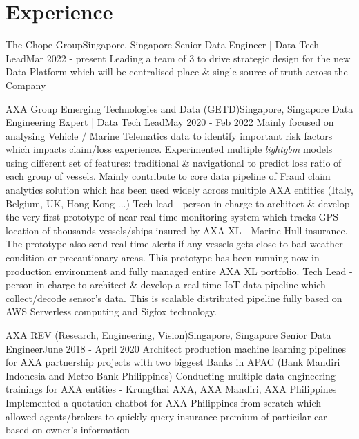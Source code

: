 \section{Experience}
  \resumeSubHeadingListStart

    \resumeSubheading
      {The Chope Group}{Singapore, Singapore}
      {Senior Data Engineer | Data Tech Lead}{Mar 2022 - present}
      \resumeItemListStart
          {Leading a team of 3 to drive strategic design for the new Data Platform which will be centralised place \& single source of truth across the Company}
    \resumeItemListEnd

    \resumeSubheading
      {AXA Group Emerging Technologies and Data (GETD)}{Singapore, Singapore}
      {Data Engineering Expert | Data Tech Lead}{May 2020 - Feb 2022}
      \resumeItemListStart
          {Mainly focused on analysing Vehicle / Marine Telematics data to identify important risk factors which impacts claim/loss experience. Experimented multiple \emph{lightgbm} models using different set of features: traditional \& navigational to predict loss ratio of each group of vessels.}
          {Mainly contribute to core data pipeline of Fraud claim analytics solution which has been used widely across multiple AXA entities (Italy, Belgium, UK, Hong Kong ...)}
          {Tech lead - person in charge to architect \& develop the very first prototype of near real-time monitoring system which tracks GPS location of thousands vessels/ships insured by AXA XL - Marine Hull insurance. The prototype also send real-time alerts if any vessels gets close to bad weather condition or precautionary areas. This prototype has been running now in production environment and fully managed entire AXA XL portfolio.}
          {Tech Lead - person in charge to architect \& develop a real-time IoT data pipeline which collect/decode sensor’s data. This is scalable distributed pipeline fully based on AWS Serverless computing and Sigfox technology.}
      \resumeItemListEnd

    \resumeSubheading
      {AXA REV (Research, Engineering, Vision)}{Singapore, Singapore}
      {Senior Data Engineer}{June 2018 - April 2020}
      \resumeItemListStart
          {Architect production machine learning pipelines for AXA partnership projects with two biggest Banks in APAC (Bank Mandiri Indonesia and Metro Bank Philippines)}
          {Conducting multiple data engineering trainings for AXA entities - Krungthai AXA, AXA Mandiri, AXA Philippines}
          {Implemented a quotation chatbot for AXA Philippines from scratch which allowed agents/brokers to quickly query insurance premium of particilar car based on owner's information}
      \resumeItemListEnd

